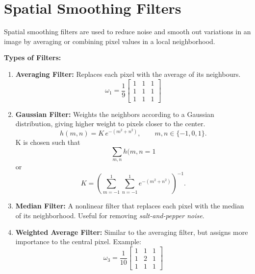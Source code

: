 \section{Spatial Smoothing Filters}
Spatial smoothing filters are used to reduce noise and smooth out variations in an image by averaging or combining pixel values in a local neighborhood.

\textbf{Types of Filters:}
\begin{enumerate}
    \item \textbf{Averaging Filter:} Replaces each pixel with the average of its neighbours.  
    \[
    \omega_1 = \frac{1}{9}
    \begin{bmatrix}
        1 & 1 & 1 \\
        1 & 1 & 1 \\
        1 & 1 & 1
    \end{bmatrix}
    \]

    \item \textbf{Gaussian Filter:} Weights the neighbors according to a Gaussian distribution, 
    giving higher weight to pixels closer to the center.  
    \[
    h(m,n) = K\, e^{-(m^2+n^2)}, \qquad m,n \in \{-1,0,1\}.
    \]
    K is chosen such that 
    \[
    \sum_{m,n}{h(m,n} = 1
    \]
    or
    \[
K=\left(\sum_{m=-1}^{1}\sum_{n=-1}^{1} e^{-(m^2+n^2)}\right)^{-1}.
\]
    
    \item \textbf{Median Filter:} A nonlinear filter that replaces each pixel 
    with the median of its neighborhood.  
    Useful for removing \emph{salt-and-pepper noise}.

    \item \textbf{Weighted Average Filter:} Similar to the averaging filter, 
    but assigns more importance to the central pixel.  
    Example:  
    \[
    \omega_3 = \frac{1}{10}
    \begin{bmatrix}
        1 & 1 & 1 \\
        1 & 2 & 1 \\
        1 & 1 & 1
    \end{bmatrix}
    \]
\end{enumerate}

